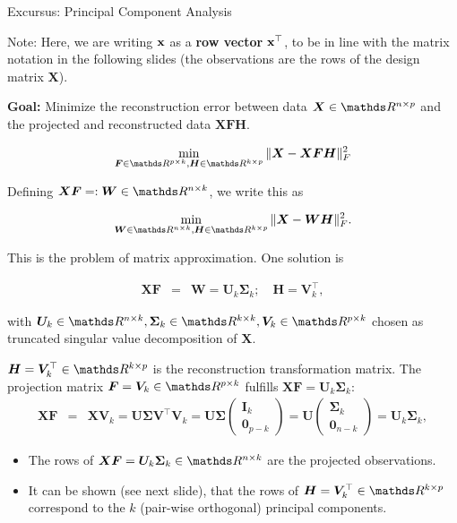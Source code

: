 \documentclass[11pt,compress,t,notes=noshow, xcolor=table]{beamer}
\begin{document}
\begin{vbframe}{Excursus: Principal Component Analysis}
\begin{footnotesize}
	Note: Here, we are writing $\mathbf{x}$ as a \textbf{row vector} $\mathbf{x}^\top$, to be in line with the matrix notation in the following slides (the observations are the rows of the design matrix $\bm{X}$).
\end{footnotesize}

\framebreak

\textbf{Goal:} Minimize the reconstruction error between data $\bm{X} \in \R^{n \times p}$ and the projected and reconstructed data $\bm{XFH}$.

$$
\min_{\bm{F} \in \R^{p \times k}, \bm{H} \in \R^{k \times p}} \|\bm{X} - \bm{X}\bm{F}\bm{H}\|^2_F
$$

Defining $\bm{X\bm{F}} =: \bm{W} \in \R^{n \times k}$, we write this as 

$$
\min_{\bm{W} \in \R^{n \times k}, \bm{H} \in \R^{k \times p}} \|\bm{X} - \bm{W}\bm{H}\|^2_F.
$$

This is the problem of matrix approximation. One solution is 

\begin{eqnarray*}
\bm{XF} &=&\bm{W} = \mathbf{U}_k \boldsymbol{\Sigma}_k; \quad \bm{H} =  \mathbf{V}_k^\top, 
\end{eqnarray*}

with $\bm{U}_k \in \R^{n \times k}, \boldsymbol{\Sigma}_k \in \R^{k \times k}, \bm{V}_k \in \R^{p \times k}$ chosen as truncated singular value decomposition of $\bm{X}$.

\lz 

$\bm{H} = \bm{V}_k^\top \in \R^{k \times p}$ is the reconstruction transformation matrix. The projection matrix $\bm{F} = \bm{V}_k \in \R^{p \times k}$ fulfills $\bm{XF} = \bm{U}_k \bm{\Sigma}_k$:
\begin{eqnarray*}
\bm{XF} &=& \bm{X}\bm{V}_k = \bm{U\Sigma V}^\top \bm{V}_k = \bm{U}\bm{\Sigma} \begin{pmatrix} \bm{I}_k \\ \bm{0}_{p - k}\end{pmatrix} = \bm{U} \begin{pmatrix} \bm{\Sigma}_k \\ \bm{0}_{n - k} \end{pmatrix} = \bm{U}_k \bm{\Sigma}_k,
\end{eqnarray*}

\begin{itemize}
	\item The rows of $\bm{XF} = \bm{U}_k \boldsymbol{\Sigma}_k \in \R^{n \times k}$ are the projected observations. 
	\item It can be shown (see next slide), that the rows of $\bm{H} = \bm{V}_k^\top \in \R^{k \times p}$ correspond to the $k$ (pair-wise orthogonal) principal components.
\end{itemize}


\end{vbframe}
\end{document}
